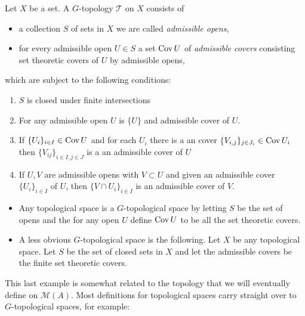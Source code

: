 \begin{definition}
	[$G$-topology]
	Let $X$ be a set. 
	A $G$-topology $\mathcal{T} $ on $X $ consists of 
	\begin{itemize}
		\item  a collection $S$ of sets in $X$ we are called \emph{admissible opens},
		\item for every admissible open $U \in S$ a set $\operatorname{Cov} U$ of \emph{admissible covers} consisting set theoretic covers of $U$ by admissible opens,
	\end{itemize}
	which are subject to the following conditions:
	\begin{enumerate}
		\item $S$ is closed under finite intersections
		\item For any admissible open $U$ is $\{U\}$ and admissible cover of $U$.
		\item If $\{U_i\}_{i \in I} \in \operatorname{Cov} U $ and for each $U_i$ there is a an cover $\{V_{i, j}\}_{j \in J_i} \in \operatorname{Cov} U_i$ then $\{V_{ij}\} _{i \in I, j \in J}$ is a an admissible cover of $U$
		\item If  $U, V$ are admissible opens with $V \subset  U$ and given an admissible cover $\{U_i\}_{i \in I} $ of $U$, then $\{V \cap U_i\} _{i \in I}$ is an admissible cover of $V$. 
	\end{enumerate}
\end{definition}
\begin{example}
	\begin{itemize}
		\item Any topological space is a $G$-topological space by letting $S$ be the set of opens and the for any open  $U$ define $\operatorname{Cov} U$ to be all the set theoretic covers. 
		\item A less obvious $G$-topological space is the following. 
			Let $X$ be any topological space. 
			Let $S$ be the set of closed sets in $X$ and let the admissible covers be the finite set theoretic covers. 
	\end{itemize}
\end{example}
This last example is somewhat related to the topology that we will eventually define on $\mathcal{M} (A)$. 
Most definitions for topological spaces carry straight over to $G$-topological spaces, for example: 

